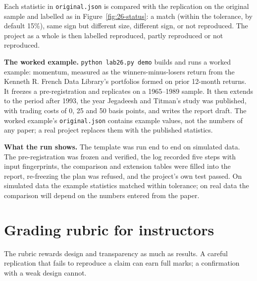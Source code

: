Each statistic in \texttt{original.json} is compared with the replication on the original sample and labelled as in Figure~\ref{fig:26-status}: a match (within the tolerance, by default 15\%), same sign but different size, different sign, or not reproduced. The project as a whole is then labelled reproduced, partly reproduced or not reproduced.

\textbf{The worked example.} \texttt{python lab26.py demo} builds and runs a worked example: momentum, measured as the winners-minus-losers return from the Kenneth R. French Data Library's portfolios formed on prior 12-month returns. It freezes a pre-registration and replicates on a 1965--1989 sample. It then extends to the period after 1993, the year Jegadeesh and Titman's study was published, with trading costs of 0, 25 and 50 basis points, and writes the report draft. The worked example's \texttt{original.json} contains example values, not the numbers of any paper; a real project replaces them with the published statistics.

\textbf{What the run shows.} The template was run end to end on simulated data. The pre-registration was frozen and verified, the log recorded five steps with input fingerprints, the comparison and extension tables were filled into the report, re-freezing the plan was refused, and the project's own test passed. On simulated data the example statistics matched within tolerance; on real data the comparison will depend on the numbers entered from the paper.

\section{Grading rubric for instructors}
\label{sec:26-rubric}

The rubric rewards design and transparency as much as results. A careful replication that fails to reproduce a claim can earn full marks; a confirmation with a weak design cannot.

